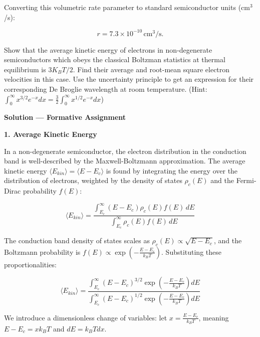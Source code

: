 Converting this volumetric rate parameter to standard semiconductor units ($\text{cm}^3$/s):

\begin{equation*}
  \boxed{r = 7.3 \times 10^{-10}\,\text{cm}^3/\text{s}.}
\end{equation*}

\begin{question}
Show that the average kinetic energy of electrons in non-degenerate semiconductors which obeys the classical Boltzman statistics at thermal equilibrium is $3K_B T/2$. Find their average and root-mean square electron velocities in this case. Use the uncertainty principle to get an expression for their corresponding De Broglie wavelength at room temperature. (Hint: $\int_0^\infty x^{3/2} e^{-x} dx = \frac{3}{2}\int_0^\infty x^{1/2} e^{-x} dx$)
\end{question}

\textbf{\large Solution --- Formative Assignment}

\textbf{1. Average Kinetic Energy}

In a non-degenerate semiconductor, the electron distribution in the conduction band is well-described by the Maxwell-Boltzmann approximation. The average kinetic energy $\langle E_{kin} \rangle = \langle E - E_c \rangle$ is found by integrating the energy over the distribution of electrons, weighted by the density of states $\rho_c(E)$ and the Fermi-Dirac probability $f(E)$:

\begin{equation*}
  \langle E_{kin} \rangle = \frac{\int_{E_c}^{\infty} (E - E_c) \rho_c(E) f(E)\,dE}{\int_{E_c}^{\infty} \rho_c(E) f(E)\,dE}
\end{equation*}

The conduction band density of states scales as $\rho_c(E) \propto \sqrt{E - E_c}$, and the Boltzmann probability is $f(E) \propto \exp\left(-\frac{E - E_c}{k_B T}\right)$. Substituting these proportionalities:

\begin{equation*}
  \langle E_{kin} \rangle = \frac{\int_{E_c}^{\infty} (E - E_c)^{3/2} \exp\left(-\frac{E - E_c}{k_B T}\right) dE}{\int_{E_c}^{\infty} (E - E_c)^{1/2} \exp\left(-\frac{E - E_c}{k_B T}\right) dE}
\end{equation*}

We introduce a dimensionless change of variables: let $x = \frac{E - E_c}{k_B T}$, meaning $E - E_c = x k_B T$ and $dE = k_B T dx$.

